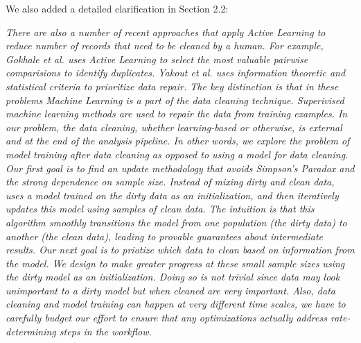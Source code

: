 \vspace{0.25em}

We also added a detailed clarification in Section 2.2:

\vspace{0.25em}

\emph{There are also a number of recent approaches that apply Active Learning to reduce number of records that need to be cleaned by a human.
For example, Gokhale et al. \cite{gokhale2014corleone} uses Active Learning to select the most valuable pairwise comparisions to identify duplicates.
Yakout et al. \cite{yakout2013don,DBLP:journals/pvldb/YakoutENOI11} uses information theoretic and statistical criteria to prioritize data repair.
The key distinction is that in these problems Machine Learning is a part of the data cleaning technique.
Superivised machine learning methods are used to repair the data from training examples.
In our problem, the data cleaning, whether learning-based or otherwise, is external and at the end of the analysis pipeline.
In other words, we explore the problem of model training \emph{after} data cleaning as opposed to using a model \emph{for} data cleaning.\\
Our first goal is to find an update methodology that avoids Simpson's Paradox and the strong dependence on sample size.
Instead of mixing dirty and clean data, \sys uses a model trained on the dirty data as an initialization, and then iteratively updates this model using samples of clean data.
The intuition is that this algorithm smoothly transitions the model from one population (the dirty data) to another (the clean data), leading to provable guarantees about intermediate results.
Our next goal is to priotize which data to clean based on information from the model.
We design \sys to make greater progress at these small sample sizes using the dirty model as an initialization.
Doing so is not trivial since data may look unimportant to a dirty model but when cleaned are very important.
Also, data cleaning and model training can happen at very different time scales, we have to carefully budget our effort to ensure that any optimizations actually address rate-determining steps in the workflow.}